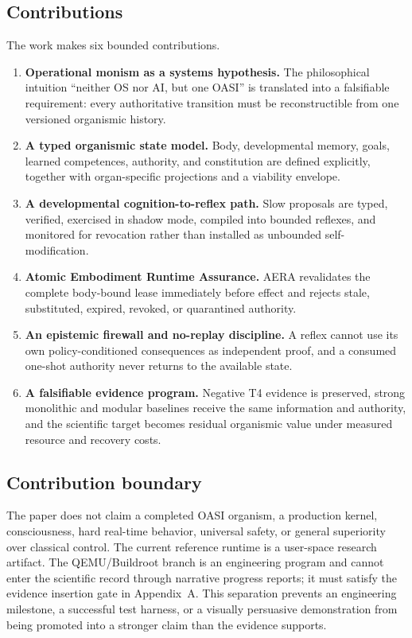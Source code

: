 \documentclass[journal,10pt]{IEEEtran}
\newcommand{\OASI}{\textsc{OASI}}
\newcommand{\AERA}{\textsc{AERA}}
\begin{document}
\subsection{Contributions}
The work makes six bounded contributions.
\begin{enumerate}
  \item \textbf{Operational monism as a systems hypothesis.} The philosophical intuition ``neither OS nor AI, but one OASI'' is translated into a falsifiable requirement: every authoritative transition must be reconstructible from one versioned organismic history.
  \item \textbf{A typed organismic state model.} Body, developmental memory, goals, learned competences, authority, and constitution are defined explicitly, together with organ-specific projections and a viability envelope.
  \item \textbf{A developmental cognition-to-reflex path.} Slow proposals are typed, verified, exercised in shadow mode, compiled into bounded reflexes, and monitored for revocation rather than installed as unbounded self-modification.
  \item \textbf{Atomic Embodiment Runtime Assurance.} \AERA{} revalidates the complete body-bound lease immediately before effect and rejects stale, substituted, expired, revoked, or quarantined authority.
  \item \textbf{An epistemic firewall and no-replay discipline.} A reflex cannot use its own policy-conditioned consequences as independent proof, and a consumed one-shot authority never returns to the available state.
  \item \textbf{A falsifiable evidence program.} Negative T4 evidence is preserved, strong monolithic and modular baselines receive the same information and authority, and the scientific target becomes residual organismic value under measured resource and recovery costs.
\end{enumerate}

\subsection{Contribution boundary}
The paper does not claim a completed \OASI{} organism, a production kernel, consciousness, hard real-time behavior, universal safety, or general superiority over classical control. The current reference runtime is a user-space research artifact. The QEMU/Buildroot branch is an engineering program and cannot enter the scientific record through narrative progress reports; it must satisfy the evidence insertion gate in Appendix~A. This separation prevents an engineering milestone, a successful test harness, or a visually persuasive demonstration from being promoted into a stronger claim than the evidence supports.
\end{document}
